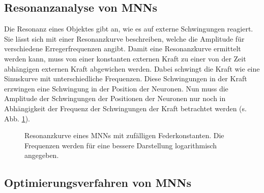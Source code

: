 \documentclass[10pt]{scrartcl}
\begin{document}



\FloatBarrier
\subsection{Resonanzanalyse von MNNs}

Die Resonanz eines Objektes gibt an, wie es auf externe Schwingungen reagiert. Sie lässt sich mit einer Resonanzkurve beschreiben, welche die Amplitude für verschiedene Erregerfrequenzen angibt. Damit eine Resonanzkurve ermittelt werden kann, muss von einer konstanten externen Kraft zu einer von der Zeit abhängigen externen Kraft abgewichen werden. Dabei schwingt die Kraft wie eine Sinuskurve mit unterschiedliche Frequenzen. Diese Schwingungen in der Kraft erzwingen eine Schwingung in der Position der Neuronen. Nun muss die Amplitude der Schwingungen der Positionen der Neuronen nur noch in Abhängigkeit der Frequenz der Schwingungen der Kraft betrachtet werden (s. Abb. \ref{fig:resonanzkurve}).

\begin{figure}[htb!]
    \centering
    \Data
    \caption{Resonanzkurve eines MNNs mit zufälligen Federkonstanten. Die Frequenzen werden für eine bessere Darstellung logarithmisch angegeben.
    }
    \label{fig:resonanzkurve}
\end{figure}

\subsection{Optimierungsverfahren von MNNs}
\end{document}
